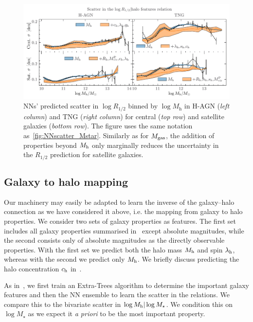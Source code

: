 \documentclass[usenatbib,useAMS]{mnras}
\begin{document}
\begin{figure}
    \centering
    \includegraphics[width=\textwidth]{Figures/NN_scatter_Reff.pdf}
    \caption{\acp{NN}' predicted scatter in $\log R_{1/2}$ binned by $\log M_\mathrm{h}$ in H-AGN (\emph{left column}) and TNG (\emph{right column}) for central (\emph{top row}) and satellite galaxies (\emph{bottom row}). The figure uses the same notation as~\cref{fig:NNscatter_Mstar}. Similarly as for $M_{\rm gas}$, the addition of properties beyond $M_{\rm h}$ only marginally reduces the uncertainty in the $R_{1/2}$ prediction for satellite galaxies.
    }
    \label{fig:NNscatter_Reff}
\end{figure}




\subsection{Galaxy to halo mapping}
\label{sec:galaxy_to_halo}

Our machinery may easily be adapted to learn the inverse of the galaxy--halo connection as we have considered it above, i.e. the mapping from galaxy to halo properties. We consider two sets of galaxy properties as features. The first set includes all galaxy properties summarised in~ except absolute magnitudes, while the second consists only of absolute magnitudes as the directly observable properties. With the first set we predict both the halo mass $M_{\rm h}$ and spin $\lambda_{\rm h}$, whereas with the second we predict only $M_{\rm h}$. We briefly discuss predicting the halo concentration $c_{\rm h}$ in~.

As in~, we first train an Extra-Trees algorithm to determine the important galaxy features and then the NN ensemble to learn the scatter in the relations. We compare this to the bivariate scatter in $\log M_{\rm h} | \log M_\star$. We condition this on $\log M_\star$ as we expect it \textit{a priori} to be the most important property.
\end{document}
